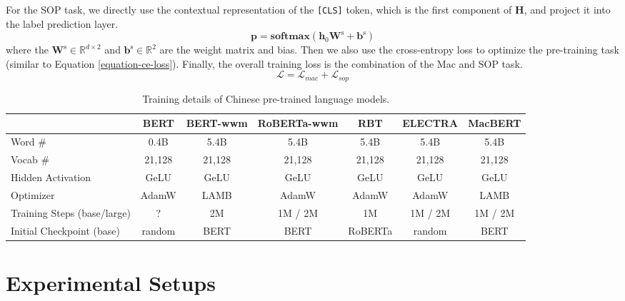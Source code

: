 \documentclass[journal]{IEEEtran}
\begin{document}
\begin{CJK*}{UTF8}{gbsn}
For the SOP task, we directly use the contextual representation of the {\tt [CLS]} token, which is the first component of $\bm{H}$, and project it into the label prediction layer.
\begin{equation}
	\bm{p} = \mathbf{softmax}(\bm{h}_0 \bm{W}^\text{s} + \bm{b}^\text{s})
\end{equation}
where the $\bm{W}^\text{s} \in \mathbb{R}^{d \times 2}$ and $\bm{b}^\text{s} \in \mathbb{R}^{2}$ are the weight matrix and bias.
Then we also use the cross-entropy loss to optimize the pre-training task (similar to Equation \ref{equation-ce-loss}).
Finally, the overall training loss is the combination of the Mac and SOP task.
\begin{equation}
	\mathcal{L} = \mathcal{L}_{mac} + \mathcal{L}_{sop}
\end{equation}



\begin{table*}[htbp]
\caption{\label{comparison-base} Training details of Chinese pre-trained language models.}
\begin{center}
\begin{tabular}{l c c c c c c}
\toprule
 	& \bf BERT & \bf BERT-wwm & \bf RoBERTa-wwm & \bf RBT & \bf ELECTRA & \bf MacBERT \\
\midrule
Word \#			& 0.4B & 5.4B  & 5.4B & 5.4B & 5.4B & 5.4B \\
Vocab \#			& 21,128 & 21,128 & 21,128 & 21,128 & 21,128 & 21,128 \\
Hidden Activation	& GeLU & GeLU  & GeLU & GeLU & GeLU & GeLU \\
Optimizer 			& AdamW & LAMB & AdamW & AdamW & AdamW & LAMB \\
Training Steps (base/large)		& ? & 2M & 1M / 2M & 1M & 1M / 2M & 1M / 2M \\
Initial Checkpoint (base) & random & BERT & BERT & RoBERTa & random & BERT \\
\bottomrule
\end{tabular}
\end{center}
\end{table*}


\section{Experimental Setups}

\end{CJK*}
\end{document}
